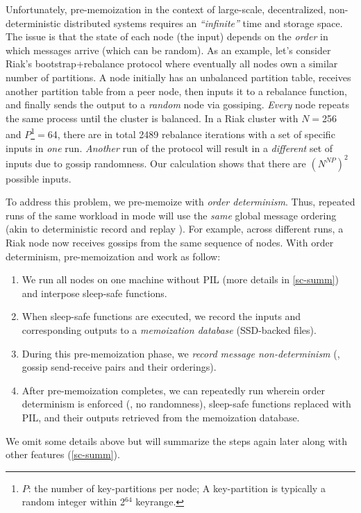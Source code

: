 Unfortunately, pre-memoization in the context of large-scale,
decentralized, non-deterministic distributed systems requires an {\em
  ``infinite''} time and storage space.  The issue is that the state of
each node (the input) depends on the {\em order} in which messages arrive
(which can be random).
%
As an example, let's consider Riak's bootstrap+rebalance protocol where
eventually all nodes own a similar number of partitions.  
A node initially has an unbalanced partition table, receives another
partition table from a peer node, then inputs it to a rebalance function,
and finally sends the output to a {\em random} node via gossiping.  {\em
  Every} node repeats the same process until the cluster is balanced.
%
In a Riak cluster
with $N$$=$256 and 
$P$\footnote{$P$: the number of key-partitions per node;  
A key-partition is typically a random integer 
within 2$^{64}$ keyrange.}$=$64, there are in total 2489 rebalance iterations
with a set of specific inputs in {\em one} run.  
{\em Another} run of the protocol will
result in a {\em different} set of inputs due to gossip randomness.
Our calculation shows that there are 
$(N^{NP})^2$ 
possible inputs.




To address this problem, we pre-memoize with {\em order determinism}.
Thus, repeated runs of the same workload in \sck mode will use the {\em
  same} global message ordering (akin to deterministic record and replay
\cite{Geels+07-Friday}).
%
For example, across different runs, a Riak node now receives gossips from
the same sequence of nodes.
%
With order determinism, pre-memoization and \sck work as follow: 
%
\begin{enumerate}
\item We run all nodes on one machine
without PIL (more details in \sec\ref{sc-summ}) and interpose
sleep-safe functions.
%
\item When sleep-safe functions are executed, we record the inputs and
corresponding outputs to a {\em memoization database} (SSD-backed files).
%
\item During this pre-memoization phase, 
we {\em record message non-determinism} (\eg,
gossip send-receive pairs and their orderings).
%
\item After pre-memoization completes, we can 
repeatedly run \sck wherein order
determinism is enforced (\eg, no randomness), sleep-safe functions
replaced with PIL, and their outputs retrieved from the memoization
database.
%
\end{enumerate}
We omit some details above but will summarize the steps again later along
with other features (\sec\ref{sc-summ}).


